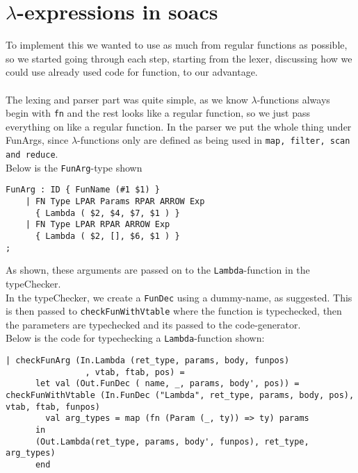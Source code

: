 \documentclass[paper=a4, fontsize=11pt]{scrartcl} %
\numberwithin{equation}{section} %
\numberwithin{figure}{section} %
\numberwithin{table}{section} %
\begin{document}
\section{$\lambda$-expressions in soacs}

To implement this we wanted to use as much from regular functions as possible, so we started going through each step, starting from the lexer, discussing how we could use already used code for function, to our advantage.\\\\
The lexing and parser part was quite simple, as we know $\lambda$-functions always begin with \verb"fn" and the rest looks like a regular function, so we just pass everything on like a regular function. In the parser we put the whole thing under FunArgs, since $\lambda$-functions only are defined as being used in \verb"map, filter, scan and reduce".\\
Below is the \verb"FunArg"-type shown
\begin{lstlisting}
FunArg : ID { FunName (#1 $1) }
    | FN Type LPAR Params RPAR ARROW Exp
      { Lambda ( $2, $4, $7, $1 ) }
    | FN Type LPAR RPAR ARROW Exp
      { Lambda ( $2, [], $6, $1 ) }
;
\end{lstlisting}

As shown, these arguments are passed on to the \verb"Lambda"-function in the typeChecker.\\
In the typeChecker, we create a \verb"FunDec" using a dummy-name, as suggested. This is then passed to \verb"checkFunWithVtable" where the function is typechecked, then the parameters are typechecked and its passed to the code-generator.\\
Below is the code for typechecking a \verb"Lambda"-function shown:
\begin{lstlisting}
| checkFunArg (In.Lambda (ret_type, params, body, funpos)
                , vtab, ftab, pos) = 
      let val (Out.FunDec ( name, _, params, body', pos)) = checkFunWithVtable (In.FunDec ("Lambda", ret_type, params, body, pos), vtab, ftab, funpos)
        val arg_types = map (fn (Param (_, ty)) => ty) params
      in  
      (Out.Lambda(ret_type, params, body', funpos), ret_type, arg_types)
      end
\end{lstlisting}
\end{document}
